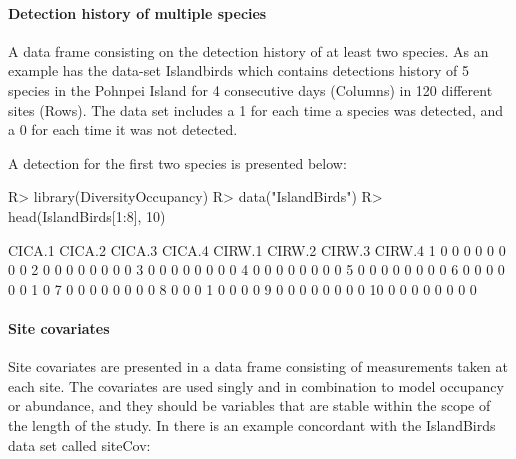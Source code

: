 \documentclass[article]{jss}
\begin{document}
\paragraph{Detection history of multiple
species}\label{detection-history-of-multiple-species}

A data frame consisting on the detection history of at least two
species. As an example  has the data-set
Islandbirds which contains detections history of 5 species in the
Pohnpei Island for 4 consecutive days (Columns) in 120 different sites
(Rows). The data set includes a 1 for each time a species was detected,
and a 0 for each time it was not detected.

A detection for the first two species is presented below:

\begin{CodeChunk}

\begin{CodeInput}
R> library(DiversityOccupancy)
R> data("IslandBirds")
R> head(IslandBirds[1:8], 10)
\end{CodeInput}

\begin{CodeOutput}
   CICA.1 CICA.2 CICA.3 CICA.4 CIRW.1 CIRW.2 CIRW.3 CIRW.4
1       0      0      0      0      0      0      0      0
2       0      0      0      0      0      0      0      0
3       0      0      0      0      0      0      0      0
4       0      0      0      0      0      0      0      0
5       0      0      0      0      0      0      0      0
6       0      0      0      0      0      0      1      0
7       0      0      0      0      0      0      0      0
8       0      0      0      1      0      0      0      0
9       0      0      0      0      0      0      0      0
10      0      0      0      0      0      0      0      0
\end{CodeOutput}
\end{CodeChunk}

\paragraph{Site covariates}\label{site-covariates}

Site covariates are presented in a data frame consisting of measurements
taken at each site. The covariates are used singly and in combination to
model occupancy or abundance, and they should be variables that are
stable within the scope of the length of the study. In
 there is an example concordant with the
IslandBirds data set called siteCov:
\end{document}
